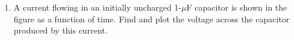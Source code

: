 \begin{enumerate}
\begin{enumerate}
\end{enumerate}

\item A current flowing in an initially uncharged 1-$\mu$F capacitor is shown
  in the figure as a function of time. Find and plot the voltage across the 
  capacitor produced by this current.




\end{enumerate}



